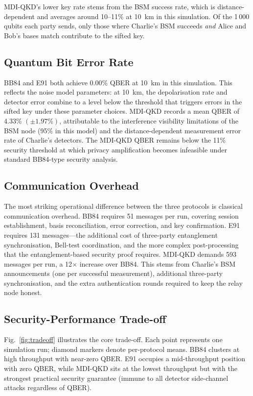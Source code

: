 \documentclass[conference]{IEEEtran}
\begin{document}
MDI-QKD's lower key rate stems from the BSM success rate, which is
distance-dependent and averages around 10--11\% at 10~km in this simulation.
Of the 1\,000 qubits each party sends, only those where Charlie's BSM
succeeds \emph{and} Alice and Bob's bases match contribute to the sifted key.

\subsection{Quantum Bit Error Rate}

BB84 and E91 both achieve 0.00\% QBER at 10~km in this simulation. This
reflects the noise model parameters: at 10~km, the depolarisation rate and
detector error combine to a level below the threshold that triggers errors
in the sifted key under these parameter choices. MDI-QKD records a
mean QBER of 4.33\% $(\pm1.97\%)$, attributable to the interference
visibility limitations of the BSM node (95\% in this model) and the
distance-dependent measurement error rate of Charlie's detectors. The
MDI-QKD QBER remains below the 11\% security threshold at which privacy
amplification becomes infeasible under standard BB84-type security analysis.

\subsection{Communication Overhead}

The most striking operational difference between the three protocols is
classical communication overhead. BB84 requires 51 messages per run, covering
session establishment, basis reconciliation, error correction, and key
confirmation. E91 requires 131 messages---the additional cost of three-party
entanglement synchronisation, Bell-test coordination, and the more complex
post-processing that the entanglement-based security proof requires.
MDI-QKD demands 593 messages per run, a 12$\times$ increase over BB84.
This stems from Charlie's BSM announcements (one per successful measurement),
additional three-party synchronisation, and the extra authentication rounds
required to keep the relay node honest.

\subsection{Security-Performance Trade-off}

Fig.~\ref{fig:tradeoff} illustrates the core trade-off. Each point represents
one simulation run; diamond markers denote per-protocol means. BB84 clusters
at high throughput with near-zero QBER. E91 occupies a mid-throughput
position with zero QBER, while MDI-QKD sits at the lowest throughput but
with the strongest practical security guarantee (immune to all detector
side-channel attacks regardless of QBER).
\end{document}
